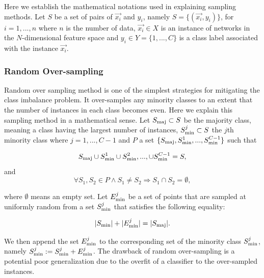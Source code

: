 \documentclass{article}
\begin{document}
 Here we establish the mathematical notations used in explaining sampling methods. Let $S$ be a set of pairs of $\vec{x_i}$ and $y_i$, namely $S =\{(\vec{x_i},y_i)\}$, for $i = 1,...,n$ where $n$ is the number of data, $\vec{x_i} \in X$ is an instance of networks in the $N$-dimensional feature space and $y_i \in Y = \{1,...,C\}$ is a class label associated with the instance $\vec{x_i}$.   


		\subsubsection{Random Over-sampling}
		Random over sampling method is one of the simplest strategies for mitigating the class imbalance problem. It over-samples any minority classes to an extent that the number of instances in each class becomes even. Here we explain this sampling method in a mathematical sense. Let $S_{\rm{maj}} \subset S$ be the majority class, meaning a class having the largest number of instances, $S_{\rm{min}}^{j} \subset S$ the $j$th minority class where $j = 1,...,C-1$ and $P$ a set $\{S_{\rm{maj}}, S_{\rm{min}}^{1},...,S_{\rm{min}}^{C-1} \}$ such that
	
	\begin{equation}
	S_{\rm{maj}} \cup S_{\rm{min}}^{1} \cup S_{\rm{min}}^{2},..., \cup S_{\rm{min}}^{C-1} = S,
	\end{equation}
	and
	\begin{equation}
	\forall S_1,S_2 \in P \land S_1 \neq S_2 \Rightarrow S_1 \cap S_2 = \emptyset,
	\end{equation}

	
where $\emptyset$ means an empty set. Let $E_{\rm{min}}^j$ be a set of points that are sampled at uniformly random from a set $S_{\rm{min}}^{j}$ that satisfies the following equality:

	\begin{equation}
	|S_{\rm{min}}| + | E_{\rm{min}}^j | = |S_{\rm{maj}}|.
	\end{equation}
	
 We then append the set $E_{\rm{min}}^j$ to the corresponding set of the minority class $S_{\rm{min}}^{j}$, namely $S_{\rm{min}}^{j} := S_{\rm{min}}^{j} + E_{\rm{min}}^j$. The drawback of random over-sampling is a potential poor generalization due to the overfit of a classifier to the over-sampled instances.
	
\end{document}
